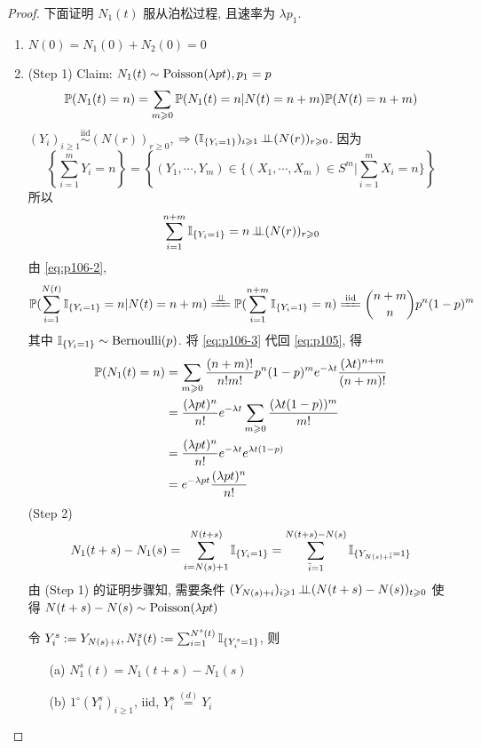 \begin{proof}
下面证明 $N_1(t)$ 服从泊松过程, 且速率为 $\lambda p_1$.
\begin{enumerate}
    \item $N(0)=N_1(0)+N_2(0)=0$
    \item (Step 1) Claim: $N_1(t)\sim\operatorname{Poisson}(\lambda pt),p_1=p$
    \begin{equation}
        \mathbb{P}(N_1(t)=n)=\sum_{m\geqslant 0}\mathbb{P}(N_1(t)=n|N(t)=n+m)\mathbb{P}(N(t)=n+m)
        \label{eq:p105}
    \end{equation}
    $(Y_i)_{i\geq 1}\overset{\text{iid}}{\sim}(N(r))_{r\geq 0}$, $\Rightarrow (\mathbb I_{\{Y_i=1\}})_{i\geqslant 1}\operatorname{\perp\!\!\!\perp} (N(r))_{r\geqslant 0}$. 因为
    \begin{equation}
        \left\{\sum_{i=1}^m Y_i=n\right\}=\left\{(Y_1,\cdots,Y_m)\in \{(X_1,\cdots,X_m)\in S^m|\sum_{i=1}^m X_i=n\}\right\}
        \label{eq:p106-1}
    \end{equation}
    所以
    \begin{equation}
        \sum_{i=1}^{n+m}\mathbb I_{\{Y_i=1\}}=n\operatorname{\perp\!\!\!\perp} (N(r))_{r\geqslant 0}
        \label{eq:p106-2}
    \end{equation}
    由 \eqref{eq:p106-2},
    \begin{equation}
        \PP(\sum_{i=1}^{N(t)}\II_{\{Y_i=1\}}=n|N(t)=n+m)\xlongequal{\ind}\PP(\sum_{i=1}^{n+m}\II_{\{Y_i=1\}}=n)\xlongequal{\text{iid}}\binom{n+m}{n}p^n(1-p)^m
        \label{eq:p106-3}
    \end{equation}
    其中 $\mathbb I_{\{Y_i=1\}}\sim\operatorname{Bernoulli}(p)$. 将 \eqref{eq:p106-3} 代回 \eqref{eq:p105}, 得
    \[
    \begin{aligned}
        \mathbb{P}(N_1(t)=n) &=\sum_{m\geqslant 0}\frac{(n+m)!}{n!m!}p^n(1-p)^m e^{-\lambda t}\frac{(\lambda t)^{n+m}}{(n+m)!}\\
        &=\frac{(\lambda pt)^n}{n!}e^{-\lambda t}\sum_{m\geqslant 0}\frac{(\lambda t(1-p))^m}{m!}\\
        &=\frac{(\lambda pt)^n}{n!}e^{-\lambda t}e^{\lambda t(1-p)}\\
        &=e^{-\lambda pt}\frac{(\lambda pt)^n}{n!}
    \end{aligned}
    \]
    (Step 2)
    \[
    N_1(t+s)-N_1(s)=\sum_{i=N(s)+1}^{N(t+s)}\mathbb I_{\{Y_i=1\}}=\sum_{\tilde{i}=1}^{N(t+s)-N(s)}\mathbb I_{\{Y_{N(s)+\tilde{i}}=1\}}
    \]
    由 (Step 1) 的证明步骤知, 需要条件 $(Y_{N(s)+i})_{i\geqslant 1}\operatorname{\perp\!\!\!\perp} (N(t+s)-N(s))_{t\geqslant 0}$ 使得 $N(t+s)-N(s)\sim \operatorname{Poisson}(\lambda pt)$
    \begin{lemma}\label{lem:p106}
        令 $Y_i^s:=Y_{N(s)+i}, N_1^s(t):=\sum_{i=1}^{N^s(t)}\mathbb I_{\{Y_i^s=1\}}$, 则
        \begin{enumerate}
            \item[(a)] $N_1^s(t)=N_1(t+s)-N_1(s)$
            \item[(b)] $1^{\circ} (Y_i^s)_{i\geq 1}$, iid, $Y_i^s\overset{(d)}{=}Y_i$
            

\end{enumerate}
\end{lemma}
\end{enumerate}
\end{proof}
